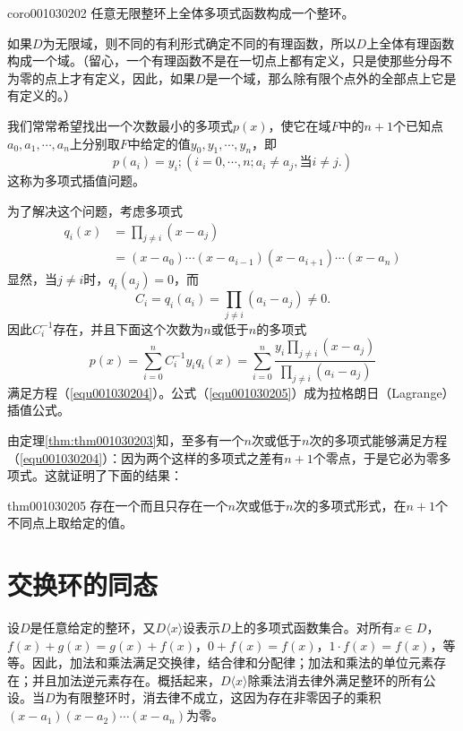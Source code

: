 \begin{corollary}{}{coro001030202}
任意无限整环上全体多项式函数构成一个整环。
\end{corollary}

如果$D$为无限域，则不同的有利形式确定不同的有理函数，所以$D$上全体有理函数构成一个域。（留心，一个有理函数不是在一切点上都有定义，只是使那些分母不为零的点上才有定义，因此，如果$D$是一个域，那么除有限个点外的全部点上它是有定义的。）

我们常常希望找出一个次数最小的多项式$p(x)$，使它在域$F$中的$n+1$个已知点$a_0,a_1,\cdots,a_n$上分别取$F$中给定的值$y_0,y_1,\cdots,y_n$，即
\begin{equation}\label{equ001030204}
p(a_i) = y_i;(i=0,\cdots,n;a_i \neq a_j,\text{当}i\neq j.)
\end{equation}
这称为多项式插值问题。

为了解决这个问题，考虑多项式
\[
\begin{aligned}
q_i(x) &= \prod_{j \neq i}{(x-a_j)}\\
&=(x-a_0)\cdots(x-a_{i-1})(x-a_{i+1})\cdots(x-a_n)
\end{aligned}
\]
显然，当$j \neq i$时，$q_i(a_j)=0$，而
\[
C_i=q_i(a_i) = \prod_{j \neq i}{(a_i - a_j)} \neq 0.
\]
因此$C_i^{-1}$存在，并且下面这个次数为$n$或低于$n$的多项式
\begin{equation}\label{equ001030205}
p(x)=\sum_{i=0}^{n}{C_i^{-1}y_iq_i(x)}=\sum_{i=0}^{n}{\frac{y_i\prod_{j \neq i}{(x-a_j)}}{\prod_{j \neq i}{(a_i - a_j)}}}
\end{equation}
满足方程（\ref{equ001030204}）。公式（\ref{equ001030205}）成为拉格朗日（Lagrange）插值公式。

由定理\ref{thm:thm001030203}知，至多有一个$n$次或低于$n$次的多项式能够满足方程（\ref{equ001030204}）：因为两个这样的多项式之差有$n+1$个零点，于是它必为零多项式。这就证明了下面的结果：
\begin{theorem}{}{thm001030205}
存在一个而且只存在一个$n$次或低于$n$次的多项式形式，在$n+1$个不同点上取给定的值。
\end{theorem}



\section{交换环的同态}\label{subsection0010303}
设$D$是任意给定的整环，又$D\langle{}x\rangle$设表示$D$上的多项式函数集合。对所有$x \in D$，$f(x)+g(x)=g(x)+f(x)$，$0+f(x)=f(x)$，$1 \cdot f(x)=f(x)$，等等。因此，加法和乘法满足交换律，结合律和分配律；加法和乘法的单位元素存在；并且加法逆元素存在。概括起来，$D\langle{}x\rangle$除乘法消去律外满足整环的所有公设。当$D$为有限整环时，消去律不成立，这因为存在非零因子的乘积$(x-a_1)(x-a_2)\cdots(x-a_n)$为零。

